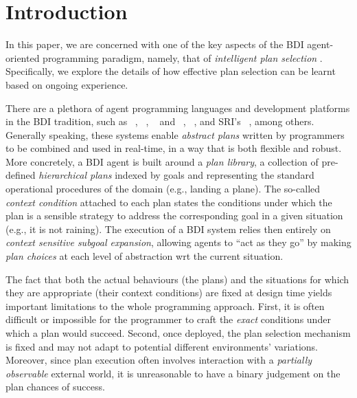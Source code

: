 \section{Introduction}\label{sec:intro}

In this paper, we are concerned with one of the key aspects of the BDI
agent-oriented programming paradigm, namely, that of \emph{intelligent plan
selection} \cite{Pollack92-IRMA,Georgeff89-PRS}.
Specifically, we explore the details of how effective plan selection can be
learnt based on ongoing experience.


There are a plethora of agent programming languages and development platforms in
the BDI tradition, such as  \PRS\ \cite{Georgeff89-PRS}, \JACK~\cite{Busetta99jack},
\TAPL~\cite{Hindriks99:Agent} and \DAPL~\cite{Dastani:JAAMAS08-2APL},
\JASON~\cite{jasonbook}, and SRI's \SPARK~\cite{MorelyM:AAMAS04-SPARK}, among
others. %
Generally speaking, these systems enable \emph{abstract plans} written by
programmers to be combined and used in real-time, in a way that is both flexible
and robust. More concretely, a BDI agent is built around a
\textit{plan library}, a collection of pre-defined \textit{hierarchical plans}
indexed by goals and representing the standard operational procedures of the
domain (e.g., landing a plane).
The so-called \emph{context condition} attached to each plan states the
conditions under which the plan is a sensible strategy to address the
corresponding goal in a given situation (e.g., it is not raining). The execution
of a BDI system relies then entirely on \textit{context sensitive subgoal
expansion}, allowing agents to ``act as they go'' by making \emph{plan
choices} at each level of abstraction wrt the current situation.



The fact that both the actual behaviours (the plans) and the situations for which
they are appropriate (their context conditions) are fixed at design time yields
important limitations to the whole programming approach.
First, it is often difficult or impossible for the programmer to craft the
\emph{exact} conditions under which a plan would succeed. Second, once deployed,
the plan selection mechanism is fixed and may not adapt to potential different
environments' variations.
Moreover, since plan execution often involves interaction with a \emph{partially
observable} external world, it is unreasonable to have a binary judgement on the
plan chances of success.



